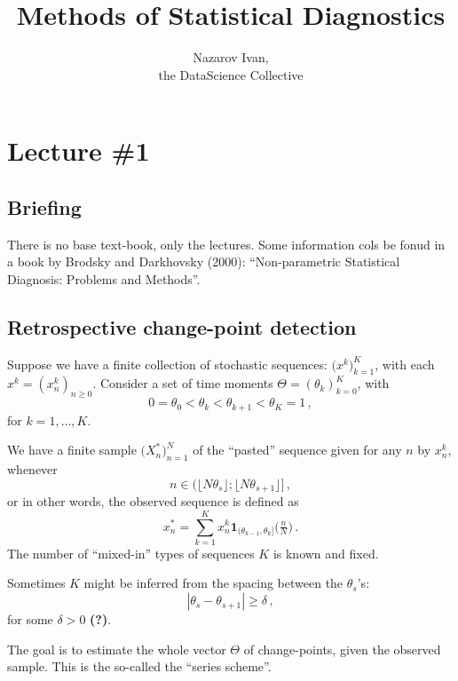 \documentclass[a4paper]{article}
\title{Methods of Statistical Diagnostics}
\author{Nazarov Ivan, \rus{201мНОД(ИССА)}\\the DataScience Collective}
\newcommand{\one}{\mathbf{1}}
\newcommand{\wat}{\textbf{(?)}}
\begin{document}
\maketitle

\section{Lecture \#1} %
\label{sec:lecture_1}

\subsection{Briefing} %
\label{sub:briefing}

There is no base text-book, only the lectures. Some information cols be fonud in
a book by Brodsky and Darkhovsky (2000): ``Non-parametric Statistical Diagnosis:
Problems and Methods''.


\subsection{Retrospective change-point detection} %
\label{sub:retrospective_change_point_detection}

Suppose we have a finite collection of stochastic sequences: $\bigl(x^k\bigr)_{k=1}^K$,
with each $x^k = (x^k_n)_{n\geq 0}$. Consider a set of time moments
$\Theta = (\theta_k)_{k=0}^K$, with
\[0 = \theta_0 < \theta_k < \theta_{k+1} < \theta_K = 1 \,,\]
for $k=1,\ldots,K$.

We have a finite sample $\big(X^*_n\bigr)_{n=1}^N$ of the ``pasted'' sequence
given for any $n$ by $x^k_n$, whenever
\[ n\in \bigl( \lfloor N\theta_s \rfloor; \lfloor N\theta_{s+1} \rfloor \bigr] \,,\]
or in other words, the observed sequence is defined as
\[ x^*_n = \sum_{k=1}^K x^k_n \one_{(\theta_{k-1}, \theta_k]}\bigl( \tfrac{n}{N} \bigr) \,. \]
The number of ``mixed-in'' types of sequences $K$ is known and fixed.


Sometimes $K$ might be inferred from the spacing between the $\theta_s$'s:
\[ |\theta_s - \theta_{s+1} | \geq \delta \,, \]
for some $\delta > 0$ \wat.

The goal is to estimate the whole vector $\Theta$ of change-points, given
the observed sample. This is the so-called the ``series scheme''.
\end{document}
